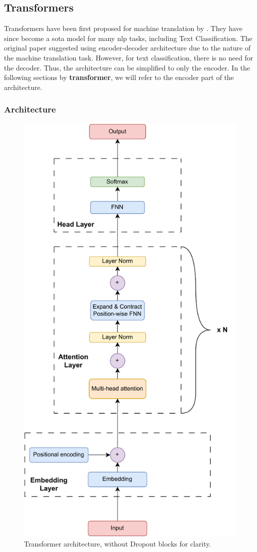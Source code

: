 \subsection{Transformers}
\label{sec:transformers}
Transformers have been first proposed for machine translation by \textcite{vaswaniAttentionAllYou2017d}.
They have since become a \ac{sota} model for many \ac{nlp} tasks, including Text Classification.
The original paper suggested using encoder-decoder architecture due to the nature of the machine translation task.
However, for text classification, there is no need for the decoder. Thus, the architecture can be simplified to only the encoder.
In the following sections by \textbf{transformer}, we will refer to the encoder part of the architecture.

\subsubsection{Architecture}
\begin{figure}[ht]
    \centering
    \includegraphics[width=0.7\linewidth]{img/transformer/trans_architecture.pdf}
    \caption{Transformer architecture, without Dropout blocks for clarity.}
    \label{fig:transformer}
\end{figure}

